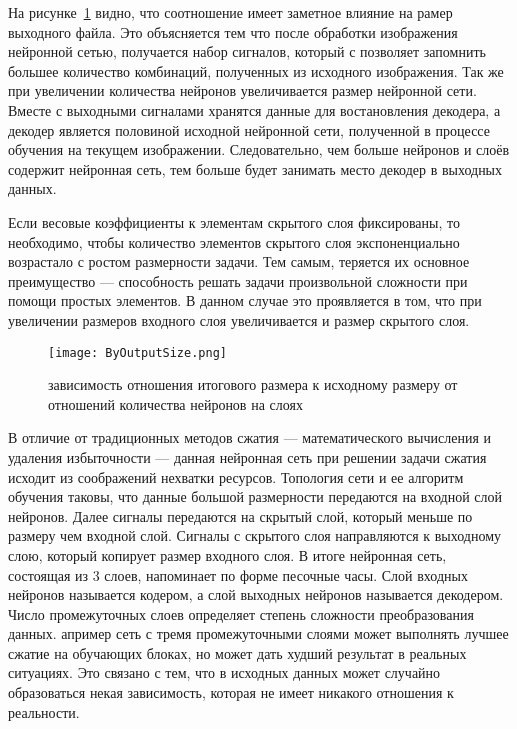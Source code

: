 На рисунке~\ref{fig:by_output_size} видно, что соотношение имеет заметное влияние на рамер выходного файла.
Это объясняется тем что после обработки изображения нейронной сетью, получается набор сигналов, который с позволяет запомнить большее количество комбинаций,
полученных из исходного изображения. Так же при увеличении количества нейронов увеличивается размер нейронной сети. Вместе с выходными сигналами хранятся
данные для востановления декодера, а декодер является половиной исходной нейронной сети, полученной в процессе обучения на текущем изображении. Следовательно, чем
больше нейронов и слоёв содержит нейронная сеть, тем больше будет занимать место декодер в выходных данных.

Если весовые коэффициенты к элементам скрытого слоя фиксированы, то необходимо, чтобы количество элементов скрытого слоя экспоненциально возрастало
с ростом размерности задачи. Тем самым, теряется их основное преимущество --- способность решать задачи произвольной сложности при помощи простых элементов.
В данном случае это проявляется в том, что при увеличении размеров входного слоя увеличивается и размер скрытого слоя.

\begin{figure}[ht]
\centering
  \texttt{[image: ByOutputSize.png]}
  \caption{ зависимость отношения итогового размера к исходному размеру от отношений количества нейронов на слоях }
  \label{fig:by_output_size}
\end{figure}

В отличие от традиционных методов сжатия --- математического вычисления и удаления избыточности --- данная нейронная сеть при решении задачи сжатия исходит
из соображений нехватки ресурсов. Топология сети и ее алгоритм обучения таковы, что данные большой размерности передаются на входной слой нейронов.
Далее сигналы передаются на скрытый слой, который меньше по размеру чем входной слой. Сигналы с скрытого слоя направляются к выходному слою, который
копирует размер входного слоя. В итоге нейронная сеть, состоящая из 3 слоев, напоминает по форме песочные часы.
Слой входных нейронов называется кодером, а слой выходных нейронов называется декодером.
Число промежуточных слоев определяет степень сложности преобразования данных.
апример сеть с тремя промежуточными слоями может выполнять лучшее сжатие на обучающих блоках,
но может дать худший результат в реальных ситуациях. Это связано с тем, что в исходных данных может случайно образоваться некая зависимость,
которая не имеет никакого отношения к реальности.


